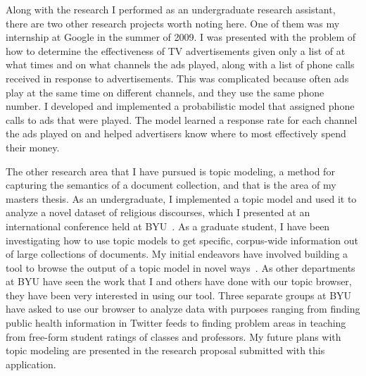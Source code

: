 \documentclass[onecolumn, 12pt]{article}
\begin{document}
Along with the research I performed as an undergraduate research assistant,
there are two other research projects worth noting here.  One of them was my
internship at Google in the summer of 2009.  I was presented with the problem
of how to determine the effectiveness of TV advertisements given only a list of
at what times and on what channels the ads played, along with a list of phone
calls received in response to advertisements.  This was complicated because
often ads play at the same time on different channels, and they use the same
phone number.  I developed and implemented a probabilistic model that assigned
phone calls to ads that were played.  The model learned a response rate for
each channel the ads played on and helped advertisers know where to most
effectively spend their money.

The other research area that I have pursued is topic modeling, a method for
capturing the semantics of a document collection, and that is the area of my
masters thesis.  As an undergraduate, I implemented a topic model and used it
to analyze a novel dataset of religious discourses, which I presented at an
international conference held at
BYU~\cite{gardner-2010-general-conference-topics}.  As a graduate student, I
have been investigating how to use topic models to get specific, corpus-wide
information out of large collections of documents.  My initial endeavors have
involved building a tool to browse the output of a topic model in novel
ways~\cite{gardner-2010-topic-browser}.  As other departments at BYU have seen
the work that I and others have done with our topic browser, they have been
very interested in using our tool.  Three separate groups at BYU have asked to
use our browser to analyze data with purposes ranging from finding public
health information in Twitter feeds to finding problem areas in teaching from
free-form student ratings of classes and professors.  My future plans with
topic modeling are presented in the research proposal submitted with this
application.

\footnotesize

\renewcommand\bibsection{\subsubsection*{Publications}}

\end{document}
